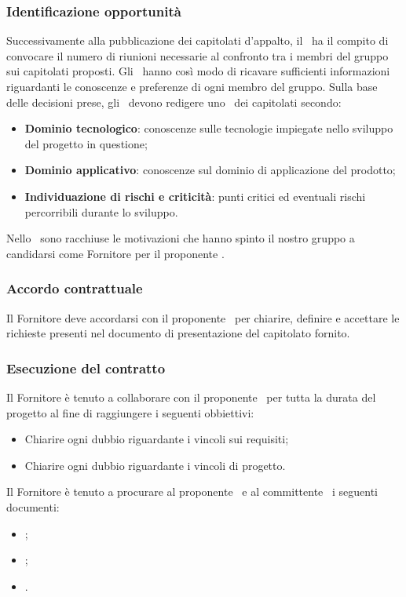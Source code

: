 \documentclass[../NormeDiProgetto.tex]{subfiles}
\begin{document}
			\subsubsection{Identificazione opportunità}
				Successivamente alla pubblicazione dei capitolati d'appalto, il
				\responsabilediprogetto\ ha il compito di convocare il numero
				di riunioni necessarie al confronto tra i membri del gruppo sui
				capitolati proposti. Gli \analisti\ hanno così modo di ricavare sufficienti
				informazioni riguardanti le conoscenze e preferenze di ogni
				membro del gruppo. Sulla base delle decisioni prese, gli
				\analisti\ devono redigere uno \studiodifattibilita\
				dei capitolati secondo:
				\begin{itemize}
					\item \textbf{Dominio tecnologico}: conoscenze sulle
					tecnologie impiegate nello sviluppo del progetto in questione;
					\item \textbf{Dominio applicativo}: conoscenze sul dominio di
					applicazione del prodotto;
					\item \textbf{Individuazione di rischi e criticità}: punti
					critici ed eventuali rischi percorribili durante lo sviluppo.
				\end{itemize}
				Nello \studiodifattibilitav\ sono racchiuse le motivazioni che hanno spinto il nostro
				gruppo a candidarsi come Fornitore per il proponente \proponente.
			\subsubsection{Accordo contrattuale}
				Il Fornitore deve accordarsi con il proponente \proponente\ per chiarire, definire e
				accettare le richieste presenti nel documento di presentazione del capitolato fornito.
			\subsubsection{Esecuzione del contratto}
				Il Fornitore è tenuto a collaborare con il proponente \proponente\ per tutta la durata
				del progetto al fine di raggiungere i seguenti obbiettivi:
				\begin{itemize}
					\item Chiarire ogni dubbio riguardante i vincoli sui requisiti;
					\item Chiarire ogni dubbio riguardante i vincoli di progetto.
				\end{itemize}
				Il Fornitore è tenuto a procurare al proponente \proponente\ e al committente
				\vardanega\ i seguenti documenti:
				\begin{itemize}
					\item \pianodiprogetto;
					\item \analisideirequisiti;
					\item \pianodiqualifica.
				\end{itemize}
\end{document}
